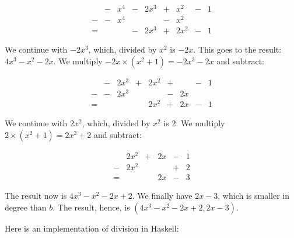 \documentclass[tikz]{scrreprt}
\begin{document}
\begin{equation}
\begin{array}{ccrcrcrcr}
  & - &  x^4 & - & 2x^3 & + &  x^2 & - & 1\\
- & - &  x^4 &   &      & - &  x^2 &   &  \\
= &   &      & - & 2x^3 & + & 2x^2 & - & 1
\end{array}
\end{equation}

We continue with $-2x^3$, which, divided by
$x^2$ is $-2x$. This goes to the result:
$4x^3 - x^2 - 2x$.
We multiply $-2x \times (x^2 + 1) = -2x^3 - 2x$
and subtract:

\begin{equation}
\begin{array}{ccrcrcrcr}
  & - & 2x^3 & + & 2x^2 & + &    & - & 1\\
- & - & 2x^3 &   &      & - & 2x &   &  \\
= &   &      &   & 2x^2 & + & 2x & - & 1 
\end{array}
\end{equation}

We continue with $2x^2$, which,
divided by $x^2$ is 2. 
We multiply $2\times (x^2 + 1) = 2x^2 + 2$
and subtract:

\begin{equation}
\begin{array}{ccrcrcrcr}
  & 2x^2 & + & 2x & - & 1\\
- & 2x^2 &   &    & + & 2\\
= &      &   & 2x & - & 3 
\end{array}
\end{equation}

The result now is
$4x^3 - x^2 - 2x + 2$.
We finally have $2x - 3$,
which is smaller in degree than $b$.
The result, hence, is
$(4x^3 - x^2 - 2x + 2, 2x - 3)$.

Here is an implementation of division in Haskell:
\end{document}
